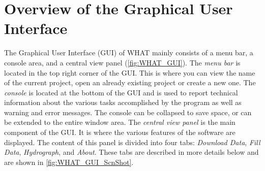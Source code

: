 \documentclass[WHATMANUAL.tex]{subfiles}
\begin{document}
\section{Overview of the Graphical User Interface}
\label{sec:GUI_overview}


The Graphical User Interface (GUI) of WHAT mainly consists of a menu bar, a console area, and a central view panel (\cref{fig:WHAT_GUI}). The \emph{menu bar} is located in the top right corner of the GUI. This is where you can view the name of the current project, open an already existing project or create a new one. The \emph{console} is located at the bottom of the GUI and is used to report technical information about the various tasks accomplished by the program as well as warning and error messages. The console can be collapsed to save space, or can be extended to the entire window area. The \emph{central view panel} is the main component of the GUI. It is where the various features of the software are displayed. The content of this panel is divided into four tabs: \emph{Download Data}, \emph{Fill Data}, \emph{Hydrograph}, and \emph{About}. These tabs are described in more details below and are shown in \cref{fig:WHAT_GUI_ScnShot}.

\begin{figure}[!hb]
    \setlength{\fboxsep}{0pt}
    {
    }
\end{figure}

\newpage
\end{document}
